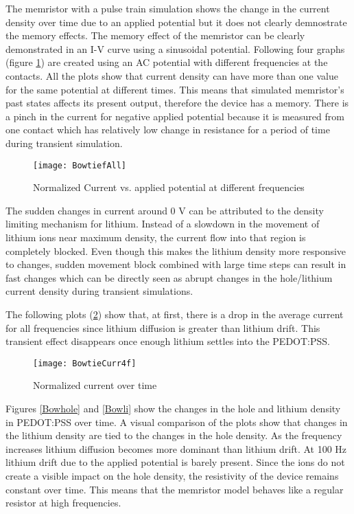 \begin{doublespace}
The memristor with a pulse train simulation shows the change in the current density over time due to an applied potential but it does not clearly demnostrate the memory effects. The memory effect of the memristor can be clearly demonstrated in an I-V curve using a sinusoidal potential. Following four graphs (figure \ref{Bowtie}) are created using an AC potential with different frequencies at the contacts. All the plots show that current density can have more than one value for the same potential at different times. This means that simulated memristor's past states affects its present output, therefore the device has a memory. There is a pinch in the current for negative applied potential because it is measured from one contact which has relatively low change in resistance for a period of time during transient simulation. 

\begin{figure}[!htp]
\centering
\texttt{[image: BowtiefAll]}
\caption{Normalized Current vs. applied potential at different frequencies} 
\label{Bowtie}
\end{figure}

The sudden changes in current around 0 V can be attributed to the density limiting mechanism for lithium. Instead of a slowdown in the movement of lithium ions near maximum density, the current flow into that region is completely blocked. Even though this makes the lithium density more responsive to changes, sudden movement block combined with large time steps can result in fast changes which can be directly seen as abrupt changes in the hole/lithium current density during transient simulations.  

The following plots (\ref{BowtieCurr}) show that, at first, there is a drop in the average current for all frequencies since lithium diffusion is greater than lithium drift. This transient effect disappears once enough lithium settles into the PEDOT:PSS. 

\begin{figure}[!htp]
\centering
\texttt{[image: BowtieCurr4f]}
\caption{Normalized current over time} 
\label{BowtieCurr}
\end{figure}

Figures \ref{Bowhole} and \ref{Bowli} show the changes in the hole and lithium density in PEDOT:PSS over time. A visual comparison of the plots show that changes in the lithium density are tied to the changes in the hole density. As the frequency increases lithium diffusion becomes more dominant than lithium drift. At 100 Hz lithium drift due to the applied potential is barely present. Since the ions do not create a visible impact on the hole density, the resistivity of the device remains constant over time. This means that the memristor model behaves like a regular resistor at high frequencies.



\end{doublespace}

